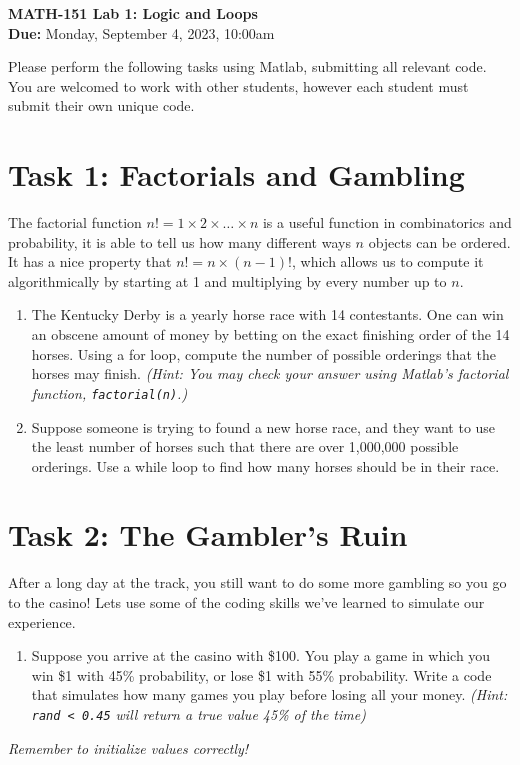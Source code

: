\documentclass[11pt]{article}
\begin{document}
	
	\begin{center}
		\Large{\textbf{MATH-151 Lab 1: Logic and Loops}}\\
			\medskip
		\normalsize{\textbf{Due:} Monday, September 4, 2023, 10:00am} 
	\end{center}
	\noindent\makebox[\linewidth]{\rule{\textwidth}{0.4pt}}
	Please perform the following tasks using Matlab, submitting all relevant code. You are welcomed to work with other students, however each student must submit their own unique code.
	\section*{Task 1: Factorials and Gambling}
	\noindent The factorial function $n! = 1\times2\times\dots\times n$ is a useful function in combinatorics and probability, it is able to tell us how many different ways $n$ objects can be ordered. It has a nice property that $n!=n\times(n-1)!$, which allows us to compute it algorithmically by starting at 1 and multiplying by every number up to $n$. \\
	\begin{enumerate}[label=\alph*)]
		\item The Kentucky Derby is a yearly horse race with 14 contestants. One can win an obscene amount of money by betting on the exact finishing order of the 14 horses. Using a for loop, compute the number of possible orderings that the horses may finish. \textit{(Hint: You may check your answer using Matlab's factorial function, \texttt{factorial(n)}.)}
		\item Suppose someone is trying to found a new horse race, and they want to use the least number of horses such that there are over 1,000,000 possible orderings. Use a while loop to find how many horses should be in their race.
	\end{enumerate}
	\section*{Task 2: The Gambler's Ruin}
	\noindent After a long day at the track, you still want to do some more gambling so you go to the casino! Lets use some of the coding skills we've learned to simulate our experience.\\
	\begin{enumerate}[label=\alph*)]
		\item Suppose you arrive at the casino with \$100. You play a game in which you win \$1 with 45\% probability, or lose \$1 with 55\% probability. Write a code that simulates how many games you play before losing all your money. \textit{(Hint: \texttt{rand < 0.45} will return a true value 45\% of the time)} 
	\end{enumerate}

	\begin{center}
		\vfill
		\textit{Remember to initialize values correctly!}
	\end{center}
\end{document}
